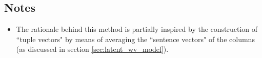 \subsection{Notes} 
\begin{itemize}
    \item The rationale behind this method is partially inspired by the construction of ``tuple vectors" by means of averaging the ``sentence vectors" of the columns (as discussed in section \ref{sec:latent_wv_model}).

\end{itemize}
